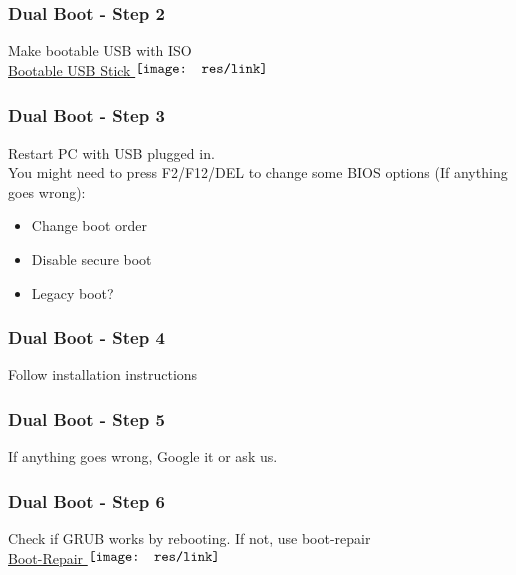 \begin{frame}
	\frametitle{Dual Boot - Step 2}
    
    Make bootable USB with ISO \\
    \href{http://www.ubuntu.com/download/desktop/create-a-usb-stick-on-windows}{Bootable USB Stick $\vcenter{\hbox{\texttt{[image: res/link]}}\vspace{0.1cm}}$} \\
    
\end{frame}

\begin{frame}
	\frametitle{Dual Boot - Step 3}
    
    Restart PC with USB plugged in.\\
    
    You might need to press F2/F12/DEL to change some BIOS options (If anything goes wrong):
 	\begin{itemize}
		\item Change boot order
		\item Disable secure boot
		\item Legacy boot?
	\end{itemize}
\end{frame}

\begin{frame}
	\frametitle{Dual Boot - Step 4}
    
    Follow installation instructions
    
\end{frame}

\begin{frame}
	\frametitle{Dual Boot - Step 5}
    
    If anything goes wrong, Google it or ask us.
    
\end{frame}

\begin{frame}
	\frametitle{Dual Boot - Step 6}
    
    Check if GRUB works by rebooting. If not, use boot-repair \\
    \href{https://help.ubuntu.com/community/Boot-Repair}{Boot-Repair $\vcenter{\hbox{\texttt{[image: res/link]}}\vspace{0.1cm}}$}
    
\end{frame}
